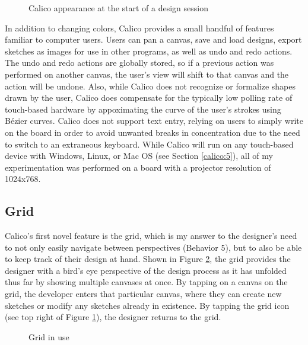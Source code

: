 \documentclass[12pt,fleqn]{ucithesis}
\begin{document}
\begin{figure}
  \centering
  \caption {Calico appearance at the start of a design session}
\label{fig:3}       %
\end{figure}
%

In addition to changing colors, Calico provides a small handful of features familiar to computer users. Users can pan a canvas, save and load designs, export sketches as images for use in other programs, as well as undo and redo actions. The undo and redo actions are globally stored, so if a previous action was performed on another canvas, the user's view will shift to that canvas and the action will be undone. Also, while Calico does not recognize or formalize shapes drawn by the user, Calico does compensate for the typically low polling rate of touch-based hardware by appoximating the curve of the user's strokes using B\'ezier curves. Calico does not support text entry, relying on users to simply write on the board in order to avoid unwanted breaks in concentration due to the need to switch to an extraneous keyboard. While Calico will run on any touch-based device with Windows, Linux, or Mac OS (see Section \ref{calico:5}), all of my experimentation was performed on a board with a projector
 resolution of 1024x768.

\subsection{Grid}
\label{calico:2}

Calico's first novel feature is the grid, which is my answer to the designer's need to not only easily navigate between perspectives (Behavior 5), but to also be able to keep track of their design at hand. Shown in Figure \ref{fig:4}, the grid provides the designer with a bird's eye perspective of the design process as it has unfolded thus far by showing multiple canvases at once. By tapping on a canvas on the grid, the developer enters that particular canvas, where they can create new sketches or modify any sketches already in existence. By tapping the grid icon (see top right of Figure \ref{fig:3}), the designer returns to the grid. 

\begin{figure}

\caption {Grid in use}
\label{fig:4}       %
\end{figure}
%
\end{document}
